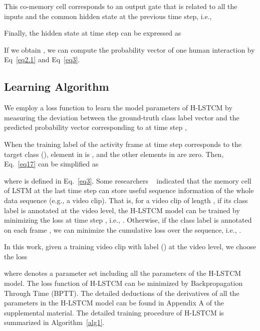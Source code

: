 \documentclass[9pt,journal,letterpaper,twocolumn]{IEEEtran}
\begin{document}
	This co-memory cell  corresponds to an output gate  that is related to all the inputs and the common hidden state at the previous time step, i.e.,
	
	Finally, the hidden state  at time step  can be expressed as
	
	
	
	If we obtain ,  we can compute the probability vector  of one human interaction by Eq~\eqref{eq2.1} and Eq~\eqref{eq3}.
	


	\subsection{Learning Algorithm}
	
	
	
	We employ a loss function to learn the model parameters of H-LSTCM by measuring the deviation between the ground-truth class label vector  and the predicted probability vector  corresponding to  at time step ,
	
	When the training label of the activity frame at time step  corresponds to the target class  (), element  in  is , and the other elements in  are zero. Then, Eq.~\eqref{eq17} can be simplified as
	
	where  is defined in Eq.~\eqref{eq3}. Some researchers ~\cite{veeriah2015differential,hochreiter1997long} indicated that the memory cell of LSTM at the last time step can store useful sequence information of the whole data sequence (e.g., a video clip). That is, for a video clip of length , if its class label  is annotated at the video level, the H-LSTCM model can be trained by minimizing the loss at time step , i.e., . Otherwise, if the class label  is annotated on each frame , we can minimize the cumulative loss over the sequence, i.e., . 
	
	In this work, given a training video clip with label  () at the video level, we choose the loss
	
	where  denotes a parameter set including all the parameters of the H-LSTCM model. The loss function of H-LSTCM can be minimized by Backpropagation Through Time (BPTT).
	The detailed deductions of the derivatives of all the parameters in the H-LSTCM model can be found in Appendix A of the supplemental material. The detailed training procedure of H-LSTCM is summarized in Algorithm~\ref{alg1}.
	
\end{document}
